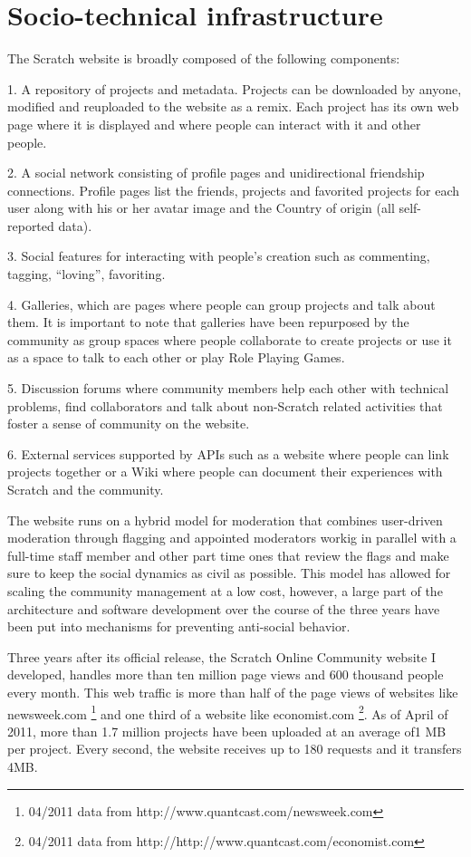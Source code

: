 \section{Socio-technical infrastructure}
The Scratch website is broadly composed of the following components: 

1. A repository of projects and metadata. Projects can be downloaded by anyone, modified and reuploaded to the website as a remix. Each project has its own web page where it is displayed and where people can interact with it and other people.

2. A social network consisting of profile pages and unidirectional friendship connections. Profile pages list the friends, projects and favorited projects for each user along with his or her avatar image and the Country of origin (all self-reported data).

3. Social features for interacting with people's creation such as commenting, tagging, ``loving'', favoriting.

4. Galleries, which are pages where people can group projects and talk about them. It is important to note that galleries have been repurposed by the community as group spaces where people collaborate to create projects or use it as a space to talk to each other or play Role Playing Games.

5. Discussion forums where community members help each other with technical problems, find collaborators and talk about non-Scratch related activities that foster a sense of community on the website.

6. External services supported by APIs such as a website where people can link projects together or a Wiki where people can document their experiences with Scratch and the community.

The website runs on a hybrid model for moderation that combines user-driven moderation through flagging and appointed moderators workig in parallel with a full-time staff member and other part time ones that review the flags and make sure to keep the social dynamics as civil as possible. 
This model has allowed for scaling the community management at a low cost, however, a large part of the architecture and software development over the course of the three years have been put into mechanisms for preventing anti-social behavior.

Three years after its official release, the Scratch Online Community website I developed, handles more than ten million page views and 600 thousand people every month.
This web traffic is more than half of the page views of websites like newsweek.com \footnote{04/2011 data from http://www.quantcast.com/newsweek.com} and one third of a website like economist.com \footnote{04/2011 data from http://http://www.quantcast.com/economist.com}.
As of April of 2011, more than 1.7 million projects have been uploaded at an average of1 MB per project. 
Every second, the website receives up to 180 requests and it transfers 4MB.

